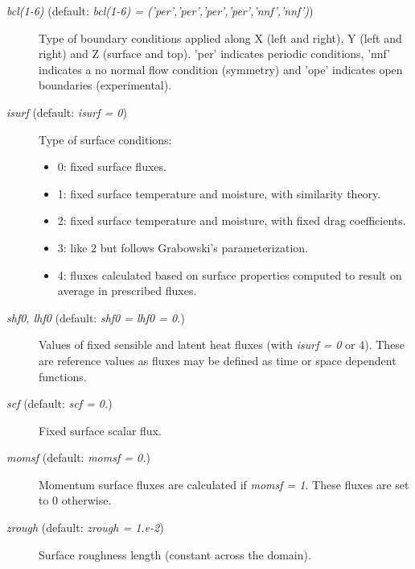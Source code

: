 \documentclass[12pt,A4,french]{article}
\begin{document}
\begin{description}

\item[{\it bcl(1-6)} (default: {\it bcl(1-6) = ('per','per','per','per','nnf','nnf')})]

Type of boundary conditions applied along X (left and right), Y (left and right) and Z (surface and top). 'per' indicates periodic conditions, 'nnf' indicates a no normal flow condition (symmetry) and 'ope' indicates open boundaries (experimental).

\item[{\it isurf} (default: {\it isurf = 0})]

Type of surface conditions:
\begin{itemize}
    \item 0: fixed surface fluxes.\\
    \item 1: fixed surface temperature and moisture, with similarity theory.\\
    \item 2: fixed surface temperature and moisture, with fixed drag coefficients.\\
    \item 3: like 2 but follows Grabowski's parameterization.\\
    \item 4: fluxes calculated based on surface properties computed to result on average in prescribed fluxes.
\end{itemize}

\item[{\it shf0, lhf0} (default: {\it shf0 = lhf0 = 0.})]

Values of fixed sensible and latent heat fluxes (with {\it isurf = 0} or 4). These are reference values as fluxes may be defined as time or space dependent functions.

\item[{\it scf} (default: {\it scf = 0.})]

Fixed surface scalar flux.

\item[{\it momsf} (default: {\it momsf = 0.})]

Momentum surface fluxes are calculated if {\it momsf = 1}. These fluxes are set to 0 otherwise.

\item[{\it zrough} (default: {\it zrough = 1.e-2})]

Surface roughness length (constant across the domain).


\end{description}
\end{document}
